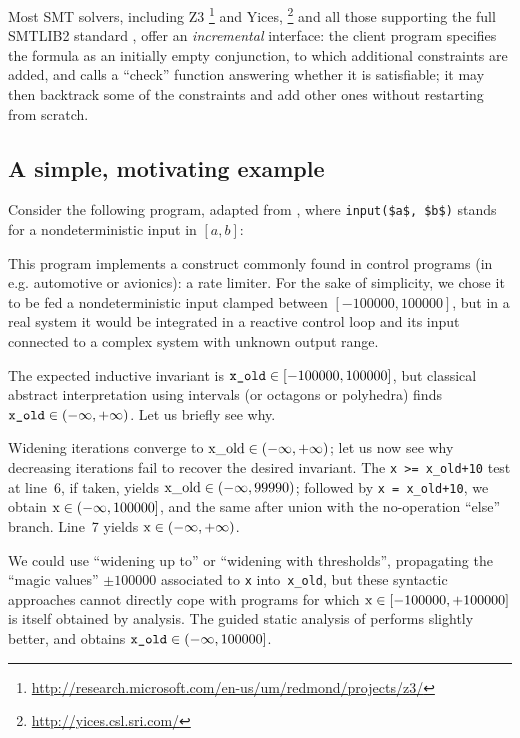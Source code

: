 \documentclass[preprint]{sigplanconf}
\begin{document}
Most SMT solvers, including Z3%
\footnote{\url{http://research.microsoft.com/en-us/um/redmond/projects/z3/}}
and Yices,%
\footnote{\url{http://yices.csl.sri.com/}}
and all those supporting the full SMTLIB2 standard \cite{BarST-SMTLIB},
offer an \emph{incremental} interface: the client program specifies the formula as an initially empty conjunction, to which additional constraints are added, and calls a ``check'' function answering whether it is satisfiable; 
it may then backtrack some of the constraints and add other ones without restarting from scratch.

\subsection{A simple, motivating example}
\label{subsec:rate_lim}
Consider the following program, adapted from \cite{Monniaux_Gonnord_SAS11}, where \lstinline|input($a$, $b$)| stands for a nondeterministic input in $[a,b]$:

This program implements a construct commonly found in control programs (in e.g. automotive or avionics): a rate limiter. For the sake of simplicity, we chose it to be fed a nondeterministic input clamped between $[-100000,100000]$, but in a real system it would be integrated in a reactive control loop and its input connected to a complex system with unknown output range.

The expected inductive invariant is $\verb|x_old| \in [-100000,100000]$, but classical abstract interpretation using intervals (or octagons or polyhedra) finds $\verb|x_old| \in (-\infty,+\infty)$. %
Let us briefly see why.

Widening iterations converge to $\lstinline|x_old| \in (-\infty,+\infty)$; let us now see why decreasing iterations fail to recover the desired invariant. %
The \lstinline|x >= x_old+10| test at line~6, if taken, yields $\lstinline|x_old| \in (-\infty,99990)$; followed by \lstinline|x = x_old+10|, we obtain $\lstinline|x| \in (-\infty,\allowbreak 100000]$, and the same after union with the no-operation ``else'' branch. Line~7 yields $\lstinline|x| \in (-\infty,+\infty)$.

We could use ``widening up to'' or ``widening with thresholds'', propagating the ``magic values'' $\pm 100000$ associated to \lstinline|x| into~\lstinline|x_old|, but these syntactic approaches cannot directly cope with programs for which $\lstinline|x|  \in [-100000,+100000]$ is itself obtained by analysis.
The guided static analysis of \citet{DBLP:conf/sas/GopanR07} performs slightly better, and obtains $\verb|x_old| \in (-\infty,100000]$.
\end{document}
